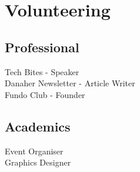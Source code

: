 \documentclass[a4paper]{deedy-resume-openfont}
\begin{document}
\begin{minipage}[t]{0.33\textwidth}
\section{Volunteering}
\subsection{Professional}
Tech Bites - Speaker \\
Danaher Newsletter - Article Writer \\
Fundo Club - Founder \\
\sectionsep

\subsection{Academics}
Event Organiser \\
Graphics Designer

%
%

\end{minipage} 
\hfill
\end{document}
